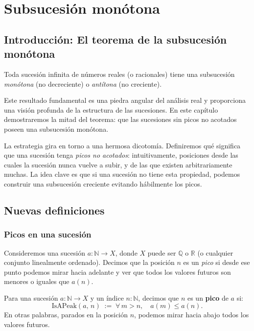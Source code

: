 \chapter{Subsucesión monótona}

\section{Introducción: El teorema de la subsucesión monótona}

\begin{claim}
Toda sucesión infinita de números reales (o racionales) tiene una subsucesión
\emph{monótona} (no decreciente) o \emph{antítona} (no creciente).
\end{claim}

Este resultado fundamental es una piedra angular del análisis real y proporciona
una visión profunda de la estructura de las sucesiones. En este capítulo
demostraremos la mitad del teorema: que las sucesiones sin picos no acotados
poseen una subsucesión monótona.

La estrategia gira en torno a una hermosa dicotomía. Definiremos qué significa
que una sucesión tenga \emph{picos no acotados}: intuitivamente, posiciones desde
las cuales la sucesión nunca vuelve a subir, y de las que existen arbitrariamente
muchas. La idea clave es que si una sucesión no tiene esta propiedad, podemos
construir una subsucesión creciente evitando hábilmente los picos.

\section{Nuevas definiciones}

\subsection{Picos en una sucesión}

Consideremos una sucesión $a : \mathbb{N} \to X$, donde $X$ puede ser
$\mathbb{Q}$ o $\mathbb{R}$ (o cualquier conjunto linealmente ordenado).
Decimos que la posición $n$ es un \emph{pico} si desde ese punto podemos mirar
hacia adelante y ver que todos los valores futuros son menores o iguales que
$a(n)$.

\begin{definicion}
Para una sucesión $a : \mathbb{N} \to X$ y un índice $n : \mathbb{N}$, decimos
que $n$ es un \textbf{pico} de $a$ si:
\[
  \mathrm{IsAPeak}(a,\, n) \;:=\; \forall\, m > n,\quad a(m) \leq a(n).
\]
En otras palabras, parados en la posición $n$, podemos mirar hacia abajo
todos los valores futuros.
\end{definicion}


